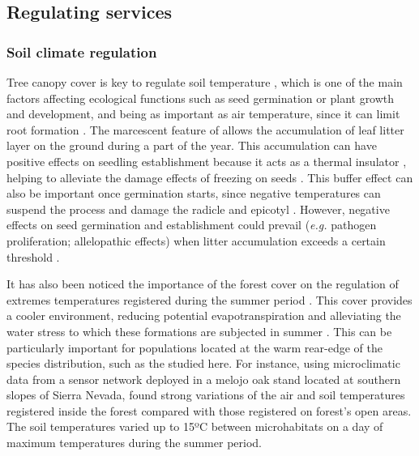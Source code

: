 \subsection{Regulating services}\label{sec:es:regulation}
\subsubsection{Soil climate regulation}\label{sec:es:regulation-soil}

Tree canopy cover is key to regulate soil temperature \autocite{Ellisonetal2017TreesForests}, which is one of the main factors affecting ecological functions such as seed germination or plant growth and development, and being as important as air temperature, since it can limit root formation \autocites{AlvarezUriaKorner2007LowTemperature}. The marcescent feature of \Qp allows the accumulation of leaf litter layer on the ground during a part of the year. This accumulation can have positive effects on seedling establishment because it acts as a thermal insulator \autocites{Loydietal2014DistributionEffects}, helping to alleviate the damage effects of freezing on seeds \autocites{Loydietal2014DistributionEffects,CavenderBaresetal2005SummerWinter,EstesoMartinezGilPelegrin2004FrostResistance,Lofetal2019TammReview}. This buffer effect can also be important once germination starts, since negative temperatures can suspend the process and damage the radicle and epicotyl \autocites{AizenWoodcock1996EffectsAcorn}. However, negative effects on seed germination and establishment could prevail (\emph{e.g.} pathogen proliferation; allelopathic effects) when litter accumulation exceeds a certain threshold \autocites{Loydietal2014DistributionEffects,XiongNilsson1999EffectsPlant}. 

It has also been noticed the importance of the forest cover on the regulation of extremes temperatures registered during the summer period \autocites{DeFrenneetal2021ForestMicroclimates}. This cover provides a cooler environment, reducing potential evapotranspiration and alleviating the water stress to which these formations are subjected in summer \autocite{Zamoraetal2021UniendoMacro}. This can be particularly important for populations located at the warm rear-edge of the species distribution, such as the studied here. For instance, using microclimatic data from a sensor network deployed in a melojo oak stand located at southern slopes of Sierra Nevada, \citet{Zamoraetal2021UniendoMacro} found strong variations of the air and soil temperatures registered inside the forest compared with those registered on forest's open areas. The soil temperatures varied up to 15ºC between microhabitats on a day of maximum temperatures during the summer period. 

